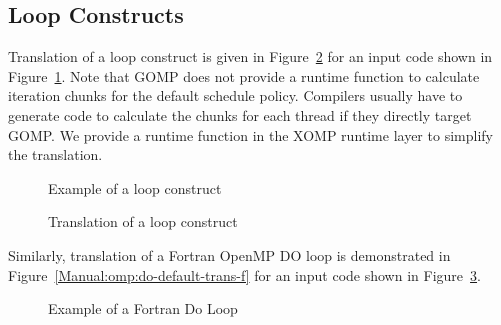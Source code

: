 \clearpage
\subsection{Loop Constructs}
Translation of a loop construct is given in
Figure~\ref{Manual:omp:ompfor-trans} for an input code shown in
Figure~\ref{Manual:omp:ompfor}. 
Note that GOMP does not provide a runtime function to calculate iteration chunks for the default schedule policy. 
Compilers usually have to generate code to calculate the chunks for each thread if they directly target GOMP. 
We provide a runtime function in the XOMP runtime layer to simplify the translation. 

\lstset{language=C,basicstyle=\scriptsize}
\begin{figure}[htbp]
{\indent
  {\mySmallFontSize
    \begin{latexonly}
    
    \end{latexonly}
    \begin{htmlonly}
    
    \end{htmlonly}
  }
}
\caption{Example of a loop construct}
\label{Manual:omp:ompfor}
\end{figure}

\begin{figure}[htbp]
{\indent
  {\mySmallFontSize
    \begin{latexonly}
    
    \end{latexonly}
    \begin{htmlonly}
    
    \end{htmlonly}
  }
}
\caption{Translation of a loop construct}
\label{Manual:omp:ompfor-trans}
\end{figure}

\clearpage
Similarly, translation of a Fortran OpenMP DO loop 
is demonstrated in
Figure~\ref{Manual:omp:do-default-trans-f} for an input code shown in
Figure~\ref{Manual:omp:do-default-f}.

\lstset{language=Fortran,basicstyle=\scriptsize}
\lstset{language=Fortran,basicstyle=\scriptsize,numbers=left}
\begin{figure}[htbp]
{\indent
  {\mySmallFontSize
    \begin{latexonly}
    
    \end{latexonly}
    \begin{htmlonly}
    
    \end{htmlonly}
  }
}
\caption{Example of a Fortran Do Loop}
\label{Manual:omp:do-default-f}
\end{figure}

